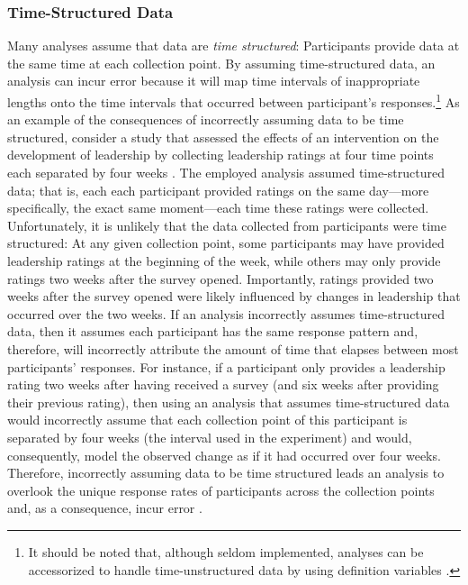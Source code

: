 \documentclass[
12pt, %
twoside,
english]{guelphthesis}
\begin{document}
\hypertarget{time-structured-data}{%
\subsubsection{Time-Structured Data}\label{time-structured-data}}

Many analyses assume that data are \emph{time structured}: Participants provide data at the same time at each collection point. By assuming time-structured data, an analysis can incur error because it will map time intervals of inappropriate lengths onto the time intervals that occurred between participant's responses.\footnote{It should be noted that, although seldom implemented, analyses can be accessorized to handle time-unstructured data by using definition variables \parencites{mehta2000}{mehta2005}.} As an example of the consequences of incorrectly assuming data to be time structured, consider a study that assessed the effects of an intervention on the development of leadership by collecting leadership ratings at four time points each separated by four weeks \autocite{day2011}. The employed analysis assumed time-structured data; that is, each each participant provided ratings on the same day---more specifically, the exact same moment---each time these ratings were collected. Unfortunately, it is unlikely that the data collected from participants were time structured: At any given collection point, some participants may have provided leadership ratings at the beginning of the week, while others may only provide ratings two weeks after the survey opened. Importantly, ratings provided two weeks after the survey opened were likely influenced by changes in leadership that occurred over the two weeks. If an analysis incorrectly assumes time-structured data, then it assumes each participant has the same response pattern and, therefore, will incorrectly attribute the amount of time that elapses between most participants' responses. For instance, if a participant only provides a leadership rating two weeks after having received a survey (and six weeks after providing their previous rating), then using an analysis that assumes time-structured data would incorrectly assume that each collection point of this participant is separated by four weeks (the interval used in the experiment) and would, consequently, model the observed change as if it had occurred over four weeks. Therefore, incorrectly assuming data to be time structured leads an analysis to overlook the unique response rates of participants across the collection points and, as a consequence, incur error \autocite{mehta2000,mehta2005,coulombe2016}.
\end{document}
